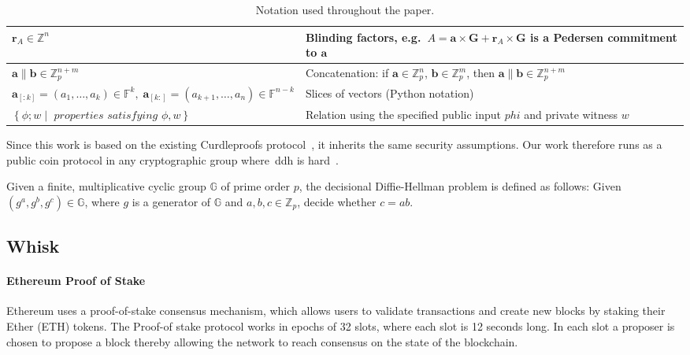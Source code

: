 \begin{table*}[!htb]
\begin{tabular}{|l|l|}
        \hline
        $\mathbf{r}_A\in\mathbb{Z}^n$ & Blinding factors, e.g.\ $A=\mathbf{a}\times\mathbf{G} + \mathbf{r}_A \times \mathbf{G}$ is a Pedersen commitment to $\mathbf{a}$ \\
        \hline
        $\mathbf{a}\parallel \mathbf{b}\in\mathbb{Z}_p^{n+m}$
        & Concatenation: if $\mathbf{a}\in\mathbb{Z}_p^n$, $\mathbf{b}\in\mathbb{Z}_p^m$, then $\mathbf{a}\parallel \mathbf{b}\in\mathbb{Z}_p^{n+m}$ \\
        \hline
        $\mathbf{a}_{[:k]}=(a_1,\dots,a_k)\in\mathbb{F}^k, \; \mathbf{a}_{[k:]}=(a_{k+1},\dots,a_n)\in\mathbb{F}^{n-k}$
        & Slices of vectors (Python notation) \\
        \hline
        $\left\{\phi; w\middle|\textit{ properties satisfying }\phi,w\right\}$
        & Relation using the specified public input $phi$ and private witness $w$ \\
        \hline
    \end{tabular}
    \caption{Notation used throughout the paper.}
    \label{tab:notation}
\end{table*}


Since this work is based on the existing Curdleproofs protocol~\cite{Curdleproofs}, it inherits the same security assumptions.
Our work therefore runs as a public coin protocol in any cryptographic group where~\gls{ddh} is hard~\cite{10.1007/BFb0054851}.

\begin{definition}[DDH]
 Given a finite, multiplicative cyclic group $\mathbb{G}$ of prime order $p$, the decisional Diffie-Hellman problem is defined as follows: Given $(g^a,g^b,g^c)\in\mathbb{G}$, where $g$ is a generator of $\mathbb{G}$ and $a,b,c\in\mathbb{Z}_p$, decide whether $c=ab$.
\end{definition}

\subsection{Whisk}\label{subsec:related-work-whisk}

\paragraph*{\textbf{Ethereum Proof of Stake}}\label{par:background-ethereum}
Ethereum uses a proof-of-stake consensus mechanism, which allows users to validate transactions and create new blocks by staking their Ether (ETH) tokens.
The Proof-of stake protocol works in epochs of 32 slots, where each slot is 12 seconds long.
In each slot a proposer is chosen to propose a block thereby allowing the network to reach consensus on the state of the blockchain.

